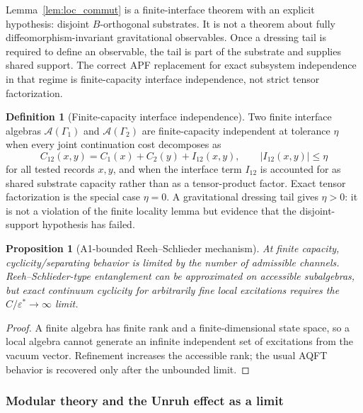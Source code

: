 \documentclass[11pt]{article}
\newtheorem{proposition}[theorem]{Proposition}
\theoremstyle{definition}
\newtheorem{definition}[theorem]{Definition}
\begin{document}
\begin{tcolorbox}[apfbox, title={Scope of the finite locality lemma}]
\footnotesize
Lemma~\ref{lem:loc_commut} is a finite-interface theorem with an explicit
hypothesis: disjoint $B$-orthogonal substrates.  It is not a theorem about
fully diffeomorphism-invariant gravitational observables.  Once a dressing
tail is required to define an observable, the tail is part of the substrate
and supplies shared support.  The correct APF replacement for exact
subsystem independence in that regime is finite-capacity interface
independence, not strict tensor factorization.
\end{tcolorbox}

\begin{definition}[Finite-capacity interface independence]
\label{def:finite_capacity_interface_independence}
Two finite interface algebras $\mathcal A(\Gamma_1)$ and
$\mathcal A(\Gamma_2)$ are finite-capacity independent at tolerance
$\eta$ when every joint continuation cost decomposes as
\[
  C_{12}(x,y)=C_1(x)+C_2(y)+I_{12}(x,y),\qquad
  |I_{12}(x,y)|\le \eta
\]
for all tested records $x,y$, and when the interface term $I_{12}$ is
accounted for as shared substrate capacity rather than as a tensor-product
factor.  Exact tensor factorization is the special case $\eta=0$.  A
gravitational dressing tail gives $\eta>0$: it is not a violation of the
finite locality lemma but evidence that the disjoint-support hypothesis has
failed.
\end{definition}

\begin{proposition}[A1-bounded Reeh--Schlieder mechanism]\label{prop:RS_modification}
At finite capacity, cyclicity/separating behavior is limited by the number
of admissible channels.  Reeh--Schlieder-type entanglement can be
approximated on accessible subalgebras, but exact continuum cyclicity for
arbitrarily fine local excitations requires the $C/\varepsilon^*\to\infty$
limit.
\end{proposition}

\begin{proof}
A finite algebra has finite rank and a finite-dimensional state space, so a
local algebra cannot generate an infinite independent set of excitations
from the vacuum vector.  Refinement increases the accessible rank; the
usual AQFT behavior is recovered only after the unbounded limit.
\end{proof}

\subsubsection{Modular theory and the Unruh effect as a limit}
\label{sec:modular_bridge}
\end{document}
